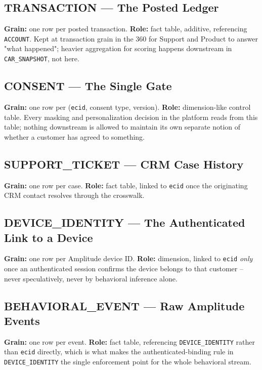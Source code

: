 \documentclass[11pt]{article}
\begin{document}
\subsection{TRANSACTION --- The Posted Ledger}
\textbf{Grain:} one row per posted transaction. \textbf{Role:} fact table, additive, referencing \texttt{ACCOUNT}. Kept at transaction grain in the 360 for Support and Product to answer "what happened"; heavier aggregation for scoring happens downstream in \texttt{CAR\_SNAPSHOT}, not here.

\subsection{CONSENT --- The Single Gate}
\textbf{Grain:} one row per (\texttt{ecid}, consent type, version). \textbf{Role:} dimension-like control table. Every masking and personalization decision in the platform reads from this table; nothing downstream is allowed to maintain its own separate notion of whether a customer has agreed to something.

\subsection{SUPPORT\_TICKET --- CRM Case History}
\textbf{Grain:} one row per case. \textbf{Role:} fact table, linked to \texttt{ecid} once the originating CRM contact resolves through the crosswalk.

\subsection{DEVICE\_IDENTITY --- The Authenticated Link to a Device}
\textbf{Grain:} one row per Amplitude device ID. \textbf{Role:} dimension, linked to \texttt{ecid} \emph{only} once an authenticated session confirms the device belongs to that customer -- never speculatively, never by behavioral inference alone.

\subsection{BEHAVIORAL\_EVENT --- Raw Amplitude Events}
\textbf{Grain:} one row per event. \textbf{Role:} fact table, referencing \texttt{DEVICE\_IDENTITY} rather than \texttt{ecid} directly, which is what makes the authenticated-binding rule in \texttt{DEVICE\_IDENTITY} the single enforcement point for the whole behavioral stream.
\end{document}
